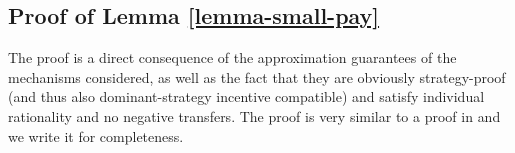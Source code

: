 \subsection{Proof of Lemma \ref{lemma-small-pay}}\label{subsec::proof-lemma-small-pay}
The proof is a direct consequence of the approximation guarantees of the mechanisms considered, as well 
as  the fact that they are
obviously strategy-proof (and thus also dominant-strategy incentive compatible) and satisfy individual rationality and no negative transfers. 
The proof is very similar to a proof in \cite{Ron24} and we write it for completeness.

